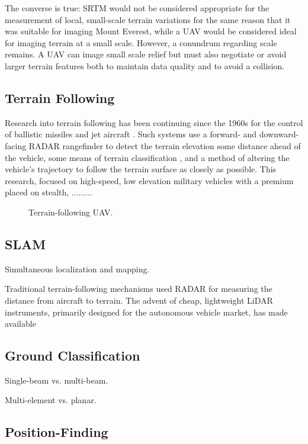 \documentclass[10pt,a4paper]{report}
\begin{document}
The converse is true: SRTM would not be considered appropriate for the measurement of local, small-scale terrain variations for the same reason that it was suitable for imaging Mount Everest, while a UAV would be considered ideal for imaging terrain at a small scale. However, a conundrum regarding scale remains. A UAV can image small scale relief but must also negotiate or avoid larger terrain features both to maintain data quality and to avoid a collision.


\subsection{Terrain Following}

Research into terrain following has been continuing since the 1960s for the control of ballistic missiles and jet aircraft \cite{KRACHMALNICK1968,Starling1971,Cunningham1980}. Such systems use a forward- and downward-facing RADAR rangefinder to detect the terrain elevation some distance ahead of the vehicle, some means of terrain classification \cite{Cunningham1980}, and a method of altering the vehicle's trajectory to follow the terrain surface as closely as possible. This research, focused on high-speed, low elevation military vehicles with a premium placed on stealth, .........

\begin{figure}
\centering
\def\svgscale{0.5}

\caption{Terrain-following UAV.}
\label{fig:uav_terrain}
\end{figure}


\subsection{SLAM}

Simultaneous localization and mapping.

Traditional terrain-following mechanisms used RADAR for measuring the distance from aircraft to terrain. The advent of cheap, lightweight LiDAR instruments, primarily designed for the autonomous vehicle market, has made available 

\subsection{Ground Classification}

Single-beam vs. multi-beam.

Multi-element vs. planar. \cite{Nobili2015}

\subsection{Position-Finding}
\end{document}
